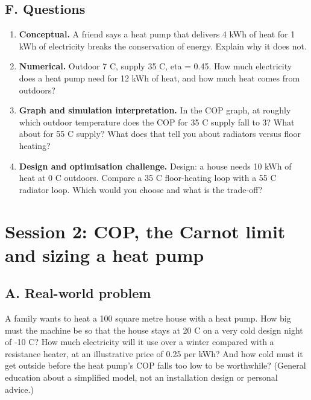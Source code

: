 \documentclass[11pt,a4paper]{article}
\begin{document}
\subsection*{F. Questions}
\begin{enumerate}[nosep]
\item \textbf{Conceptual.} A friend says a heat pump that delivers 4 kWh of heat for 1 kWh of electricity breaks the conservation of energy. Explain why it does not.
\item \textbf{Numerical.} Outdoor 7 C, supply 35 C, eta = 0.45. How much electricity does a heat pump need for 12 kWh of heat, and how much heat comes from outdoors?
\item \textbf{Graph and simulation interpretation.} In the COP graph, at roughly which outdoor temperature does the COP for 35 C supply fall to 3? What about for 55 C supply? What does that tell you about radiators versus floor heating?
\item \textbf{Design and optimisation challenge.} Design: a house needs 10 kWh of heat at 0 C outdoors. Compare a 35 C floor-heating loop with a 55 C radiator loop. Which would you choose and what is the trade-off?
\end{enumerate}

\section{Session 2: COP, the Carnot limit and sizing a heat pump}

\subsection*{A. Real-world problem}
A family wants to heat a 100 square metre house with a heat pump. How big must the machine be so that the house stays at 20 C on a very cold design night of -10 C? How much electricity will it use over a winter compared with a resistance heater, at an illustrative price of 0.25 per kWh? And how cold must it get outside before the heat pump's COP falls too low to be worthwhile? (General education about a simplified model, not an installation design or personal advice.)
\end{document}
